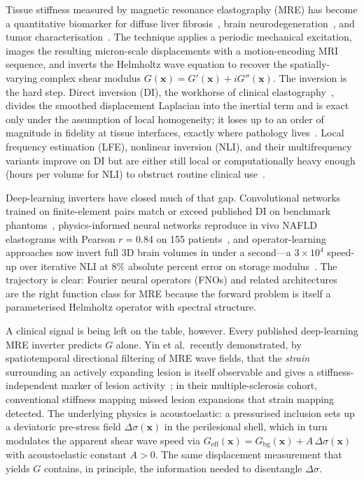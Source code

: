 \documentclass[11pt,letterpaper]{article}
\newcommand{\xvec}{\bm{x}}
\newcommand{\Geff}{G_{\mathrm{eff}}}
\newcommand{\Gbg}{G_{\mathrm{bg}}}
\newcommand{\Dsig}{\Delta\sigma}
\begin{document}
Tissue stiffness measured by magnetic resonance elastography (MRE) has
become a quantitative biomarker for diffuse liver
fibrosis~\cite{muthupillai1995,manduca2001,yin2025liver}, brain
neurodegeneration~\cite{murphy2024lowfreq}, and tumor
characterisation~\cite{he2025glioma}. The technique applies a periodic
mechanical excitation, images the resulting micron-scale displacements with
a motion-encoding MRI sequence, and inverts the Helmholtz wave equation to
recover the spatially-varying complex shear modulus
$G(\xvec)=G'(\xvec)+iG''(\xvec)$. The inversion is the hard
step. Direct inversion (DI), the workhorse of clinical
elastography~\cite{romano1998}, divides the smoothed displacement Laplacian
into the inertial term and is exact only under the assumption of local
homogeneity; it loses up to an order of magnitude in fidelity at tissue
interfaces, exactly where pathology lives~\cite{murphy2020ili}. Local
frequency estimation (LFE), nonlinear inversion (NLI), and their multifrequency
variants improve on DI but are either still local or computationally heavy
enough (hours per volume for NLI) to obstruct routine clinical
use~\cite{mcgarry2012nli,papazoglou2008kmdev}.

Deep-learning inverters have closed much of that gap. Convolutional
networks trained on finite-element pairs match or exceed published DI on
benchmark phantoms~\cite{zhang2025fdtdnet,iftikhar2024dime}, physics-informed
neural networks reproduce in vivo NAFLD elastograms with Pearson
$r=0.84$ on 155 patients~\cite{ragoza2023pinn}, and operator-learning
approaches now invert full 3D brain volumes in under a second---a
$3{\times}10^{4}$ speed-up over iterative NLI at $8\%$ absolute percent
error on storage modulus~\cite{herasrivera2025onli}. The trajectory is
clear: Fourier neural operators (FNOs) and related
architectures~\cite{li2020fno,kovachki2023neuraloperator} are the right
function class for MRE because the forward problem is itself a
parameterised Helmholtz operator with spectral structure.

A clinical signal is being left on the table, however. Every published
deep-learning MRE inverter predicts $G$ alone. Yin et al.\ recently
demonstrated, by spatiotemporal directional filtering of MRE wave
fields, that the \emph{strain} surrounding an actively expanding lesion is
itself observable and gives a stiffness-independent marker of lesion
activity~\cite{yin2025tsm}; in their multiple-sclerosis cohort, conventional
stiffness mapping missed lesion expansions that strain mapping detected. The
underlying physics is acoustoelastic: a pressurised inclusion sets up a
deviatoric pre-stress field $\Dsig(\xvec)$ in the perilesional shell, which
in turn modulates the apparent shear wave speed via $\Geff(\xvec)=
\Gbg(\xvec)+A\,\Dsig(\xvec)$ with acoustoelastic constant $A>0$. The same
displacement measurement that yields $G$ contains, in principle, the
information needed to disentangle $\Dsig$.
\end{document}
